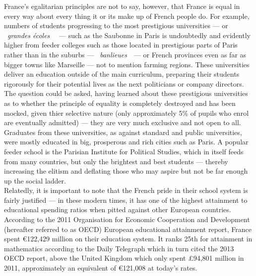 \documentclass[12pt]{article}
\begin{document}
France's egalitarian principles are not to say, however, that France
is equal in every way about every thing it or its make up of French
people do. For example, numbers of students progressing to the most
prestigious universities --- or \guillemotleft~\textit{grandes
écoles}~\guillemotright~ --- such as the Saubonne in Paris is
undoubtedly and evidently higher from feeder colleges such as those
located in prestigious parts of Paris rather than in the suburbs ---
\guillemotleft~\textit{banlieues}~\guillemotright~--- or French
provinces even as far as bigger towns like Marseille --- not to
mention farming regions. These universities deliver an education
outside of the main curriculum, preparing their students rigorously
for their potential lives as the next politicians or company
directors\cite{grandes-ecoles-telegraph}. The question could be asked,
having learned about these prestigious universities as to whether the
principle of equality is completely destroyed and has been mocked,
given thier selective nature (only approximately 5\% of pupils who
enrol are eventually admitted\cite{grandes-ecoles-telegraph}) --- they
are very much exclusive and not open to all. Graduates from these
universities, as against standard and public universities, were mostly
educated in big, prosperous and rich cities such as Paris. A popular
feeder school is the Parisian Institute for Political Studies, which
in itself feeds from many countries\cite{sciences-po-admissions}, but
only the brightest and best students --- thereby increasing the
elitism and deflating those who may aspire but not be far enough up
the social ladder.\\

Relatedly, it is important to note that the French pride in their
school system is fairly justified --- in these modern times, it has
one of the highest attainment to educational spending ratios when
pitted against other European countries. According to the 2011
Organisation for Economic Cooperation and Development (hereafter
referred to as OECD) European educational attainment
report\cite{oecd-2011}, France spent \euro{122,429 million} on their
education system. It ranks 25th for attainment in mathematics
according to the Daily Telegraph which in turn cited the 2013 OECD
report\cite{oecd-2013}, above the United Kingdom which only spent
\pounds 94,801 million in 2011\cite{oecd-2011}, approximately an
equivalent of \euro{121,008} at today's rates.\\
\end{document}
